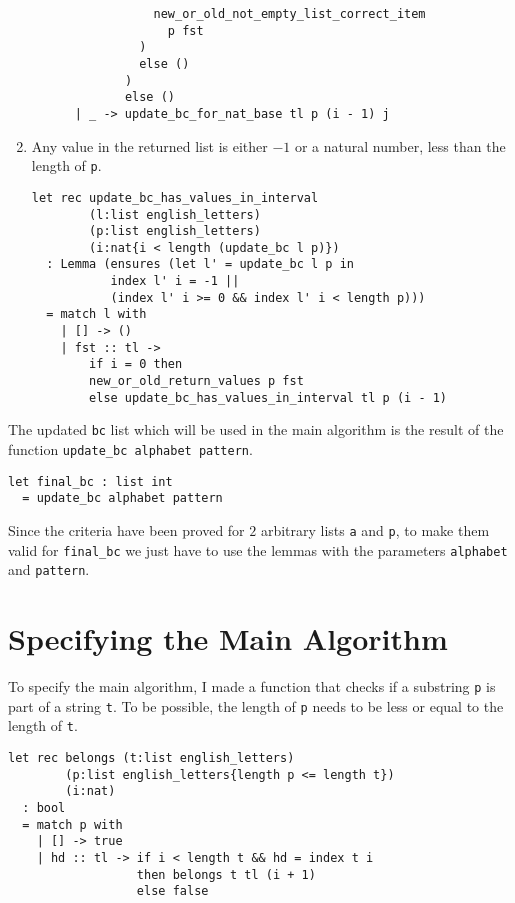\begin{enumerate}
\begin{verbatim}
                 new_or_old_not_empty_list_correct_item
                   p fst
               )
               else ()
             )
             else ()
      | _ -> update_bc_for_nat_base tl p (i - 1) j
\end{verbatim}
\item Any value in the returned list is either \(-1\) or a natural number, less than the length of \texttt{p}.
\begin{verbatim}
let rec update_bc_has_values_in_interval
        (l:list english_letters)
        (p:list english_letters)
        (i:nat{i < length (update_bc l p)})
  : Lemma (ensures (let l' = update_bc l p in
           index l' i = -1 ||
           (index l' i >= 0 && index l' i < length p)))
  = match l with
    | [] -> ()
    | fst :: tl -> 
        if i = 0 then
        new_or_old_return_values p fst
        else update_bc_has_values_in_interval tl p (i - 1)
\end{verbatim}
\end{enumerate}

The updated \texttt{bc} list which will be used in the main algorithm is the result of the function \texttt{update\_bc alphabet pattern}.

\begin{verbatim}
let final_bc : list int 
  = update_bc alphabet pattern
\end{verbatim}

Since the criteria have been proved for \(2\) arbitrary lists \texttt{a} and \texttt{p}, to make them valid for \texttt{final\_bc} we just have to use the lemmas with the parameters \texttt{alphabet} and \texttt{pattern}.

\section{Specifying the Main Algorithm}

To specify the main algorithm, I made a function that checks if a substring \texttt{p} is part of a string \texttt{t}.
To be possible, the length of \texttt{p} needs to be less or equal to the length of \texttt{t}.

\begin{verbatim}
let rec belongs (t:list english_letters)
        (p:list english_letters{length p <= length t})
        (i:nat)
  : bool
  = match p with
    | [] -> true
    | hd :: tl -> if i < length t && hd = index t i 
                  then belongs t tl (i + 1)
                  else false
\end{verbatim}

